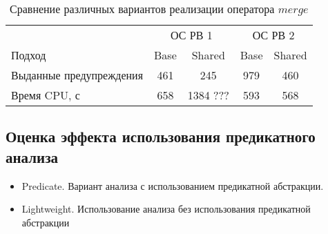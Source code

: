 \begin{center}
  \begin{table}[h]\footnotesize \centering
  	\label{table-drivers-lock-refinement}
    \caption{Сравнение различных вариантов реализации оператора $merge$}
    \begin{tabular}{ | l | c | c | c | c |  }
      \hline
      		& 			 \multicolumn{2}{|c|}{ОС РВ 1} & 	\multicolumn{2}{|c|}{ОС РВ 2}\\
      Подход         					& Base  & Shared  	& Base  & Shared 	\\ \hline
      Выданные предупреждения			& 461   & 245    	& 979   & 460  			\\ 
  	  Время CPU, с 						& 658   & 1384  ???	& 593   & 568  		\\ 
      \hline
    \end{tabular}
  \end{table}
\end{center}


\subsection{Оценка эффекта использования предикатного анализа}

\begin{itemize}
\item Predicate. Вариант анализа с использованием предикатной абстракции.
\item Lightweight. Использование анализа без использования предикатной абстракции
\end{itemize}



